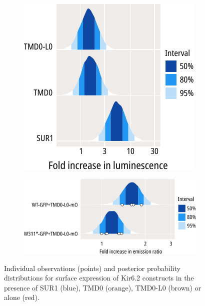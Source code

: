 \begin{figure}[h]
\begin{subfigure}[t]{0.45\textwidth}
	\end{subfigure}
	\vfill
	\begin{subfigure}[t]{0.45\textwidth}
		\caption{}\label{ch6fig:tmd0s_surface_expression_2}
		\centering
		\includegraphics[width=\textwidth]{tmd0s_surface_expression_2.pdf}
	\end{subfigure}
	\hfill
	\begin{subfigure}[t]{0.45\textwidth}
		\caption{}\label{ch6fig:gfp_ofp_contrasts_2}
		\centering
		\includegraphics[width=\textwidth]{gfp_ofp_contrasts_2.pdf}
	\end{subfigure}
	\caption[TMD0 and TMD0-LO associate with WT-GFP and W311*-GFP]{
	 Individual observations (points) and posterior probability distributions for surface expression of Kir6.2 constructs in the presence of SUR1 (blue), TMD0 (orange), TMD0-L0 (brown) or alone (red).
}
\end{figure}
